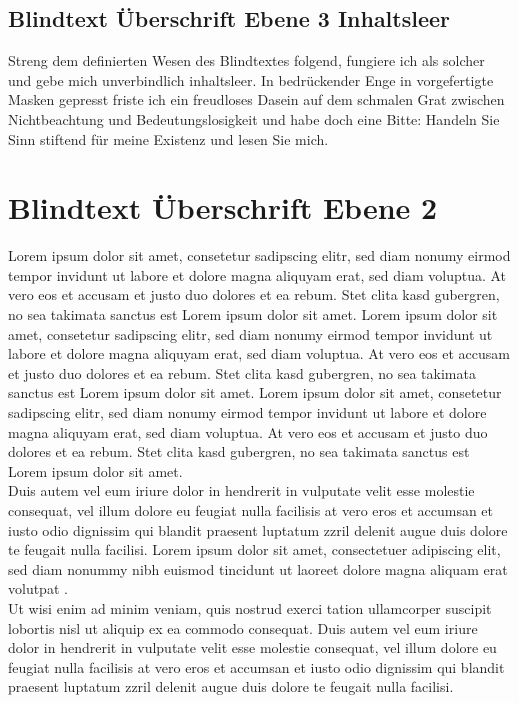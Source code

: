 \documentclass[
	english,
	ruledheaders=section,%
	class=report,%
	thesis={type=bachelor},%
	accentcolor=1b,%
	custommargins=true,%
	marginpar=false,%
	parskip=half-,%
	fontsize=11pt,%
	DIV=14,
]{tudapub}
\begin{document}
\subsection{Blindtext Überschrift Ebene 3 Inhaltsleer}
Streng dem definierten Wesen des Blindtextes folgend, fungiere ich als solcher und gebe mich unverbindlich inhaltsleer. In bedrückender Enge in vorgefertigte Masken gepresst friste ich ein freudloses Dasein auf dem schmalen Grat zwischen Nichtbeachtung und Bedeutungslosigkeit und habe doch eine Bitte: Handeln Sie Sinn stiftend für meine Existenz und lesen Sie mich.
\section{Blindtext Überschrift Ebene 2}
Lorem ipsum dolor sit amet, consetetur sadipscing elitr, sed diam nonumy eirmod tempor invidunt ut labore et dolore magna aliquyam erat, sed diam voluptua. At vero eos et accusam et justo duo dolores et ea rebum. Stet clita kasd gubergren, no sea takimata sanctus est Lorem ipsum dolor sit amet. Lorem ipsum dolor sit amet, consetetur sadipscing elitr, sed diam nonumy eirmod tempor invidunt ut labore et dolore magna aliquyam erat, sed diam voluptua. At vero eos et accusam et justo duo dolores et ea rebum. Stet clita kasd gubergren, no sea takimata sanctus est Lorem ipsum dolor sit amet. Lorem ipsum dolor sit amet, consetetur sadipscing elitr, sed diam nonumy eirmod tempor invidunt ut labore et dolore magna aliquyam erat, sed diam voluptua. At vero eos et accusam et justo duo dolores et ea rebum. Stet clita kasd gubergren, no sea takimata sanctus est Lorem ipsum dolor sit amet.\\
Duis autem vel eum iriure dolor in hendrerit in vulputate velit esse molestie consequat, vel illum dolore eu feugiat nulla facilisis at vero eros et accumsan et iusto odio dignissim qui blandit praesent luptatum zzril delenit augue duis dolore te feugait nulla facilisi. Lorem ipsum dolor sit amet, consectetuer adipiscing elit, sed diam nonummy nibh euismod tincidunt ut laoreet dolore magna aliquam erat volutpat \parencite{emse-03339298, koppe2021herausforderungen}.\\
Ut wisi enim ad minim veniam, quis nostrud exerci tation ullamcorper suscipit lobortis nisl ut aliquip ex ea commodo consequat. Duis autem vel eum iriure dolor in hendrerit in vulputate velit esse molestie consequat, vel illum dolore eu feugiat nulla facilisis at vero eros et accumsan et iusto odio dignissim qui blandit praesent luptatum zzril delenit augue duis dolore te feugait nulla facilisi.\\
\end{document}
